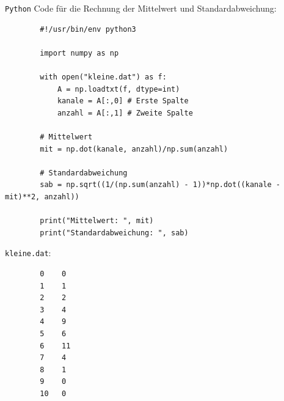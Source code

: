 \documentclass[twoside]{article}
\begin{document}
    \texttt{Python} Code für die Rechnung der Mittelwert und Standardabweichung:
    \begin{verbatim}
        #!/usr/bin/env python3

        import numpy as np
        
        with open("kleine.dat") as f:
        	A = np.loadtxt(f, dtype=int)
        	kanale = A[:,0] # Erste Spalte
        	anzahl = A[:,1] # Zweite Spalte
        
        # Mittelwert
        mit = np.dot(kanale, anzahl)/np.sum(anzahl)
        
        # Standardabweichung
        sab = np.sqrt((1/(np.sum(anzahl) - 1))*np.dot((kanale - mit)**2, anzahl))
        
        print("Mittelwert: ", mit)
        print("Standardabweichung: ", sab)
    \end{verbatim}

    \texttt{kleine.dat}:
    \begin{verbatim}
        0    0
        1    1
        2    2
        3    4
        4    9
        5    6
        6    11
        7    4
        8    1
        9    0
        10   0
    \end{verbatim}
\end{document}
